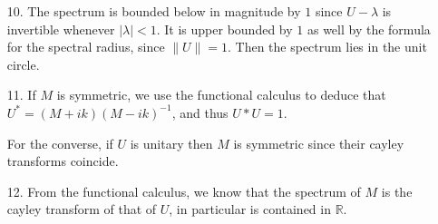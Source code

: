 \documentclass[11pt, reqno]{article}
\theoremstyle{plain}
\theoremstyle{definition}
\theoremstyle{remark}
\newcommand{\RR}{\mathbb{R}}
\begin{document}
\begin{enumerate}
    (ii.) For $f \in H$ such that $\|f\| \leq 1$, we have
    \[
        \|E(S)f\|^2 = \sum_j \|E(S)f_j\|^2 = \sum_j \int \chi_S dm_{f_j,f_j}\leq \sum_j \|f_j\| = \|f\|
    \]
    where some norms are taken in $K_j$. 

    (iii.) The operator on each $K_j$ corresponding to $E(\sigma)$ is the zero function, and 
    thus is zero on each subspace. 

    (iv.) If $S$ and $T$ are disjoint, then $E(S \cup T)$ corresponds to the function $\chi_{S \cup T} = 
    \chi_S + \chi_T$, and thus $E(S \cup T) = E(S) + E(T)$ since the map from $L^2$ to each $K_j$ is 
    a bijection. 

    (v.) The operator $M$ is multiplication by the function $f(x) = x$. Then 
    on $K_j$, since $\chi_S$ commutes with $x$, $M$ commutes with $E(S)$. 

    (vi.) $E(S \cap T)$ corresponds to $\chi_{S \cap T} = \chi_S \cdot \chi_T$, and thus $E(S \cap T) = E(S)E(T)$. 

    (vii.) Each $E(S)$ is a projection since $\chi_S^2 = \chi_S$. 
    
    (viii.) This follows since $L^2$ functions commute. 

    To verify $9'$, we just apply the convergence of step functions to $L^2$ functions in the
    $L^2(m_j)$ on each representation of
    $K_j$ to deduce the integral converges in norm on each $K_j$ and thus on $H$.

    \item[10.] The spectrum is bounded below in magnitude by $1$ since $U - \lambda$ is invertible whenever
    $|\lambda| < 1$. It is upper bounded by $1$ as well by the formula for the spectral radius,
    since $\|U\| = 1$. Then the spectrum lies in the unit circle.

    \item[11.] If $M$ is symmetric, we use the functional calculus to deduce that $U^* = (M + ik)(M -ik)^{-1}$,
    and thus $U*U = 1$. 

    For the converse, if $U$ is unitary then $M$ is symmetric since their cayley transforms coincide.

    \item[12.] From the functional calculus, we know that the spectrum of $M$ is the cayley transform of that
    of $U$, in particular is contained in $\RR$.

\end{enumerate}
\end{document}

